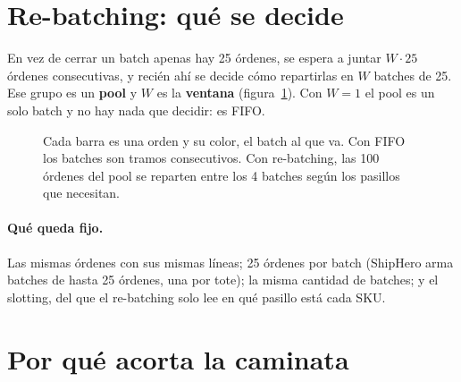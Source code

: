 \documentclass[11pt,a4paper,oneside]{report}
\begin{document}
\section{Re-batching: qué se decide}

En vez de cerrar un batch apenas hay 25 órdenes, se espera a juntar $W \cdot 25$ órdenes
consecutivas, y recién ahí se decide cómo repartirlas en $W$ batches de 25. Ese grupo es un
\textbf{pool} y $W$ es la \textbf{ventana} (figura~\ref{fig:pools}). Con $W = 1$ el pool es
un solo batch y no hay nada que decidir: es FIFO.

\begin{figure}[ht]
\centering
{}
\caption{Cada barra es una orden y su color, el batch al que va. Con FIFO los batches son
tramos consecutivos. Con re-batching, las 100 órdenes del pool se reparten entre los 4
batches según los pasillos que necesitan.}
\label{fig:pools}
\end{figure}

\paragraph{Qué queda fijo.} Las mismas órdenes con sus mismas líneas; 25 órdenes por batch
(ShipHero arma batches de hasta 25 órdenes, una por tote); la misma cantidad de batches; y el
slotting, del que el re-batching solo lee en qué pasillo está cada SKU.

\section{Por qué acorta la caminata}
\end{document}
